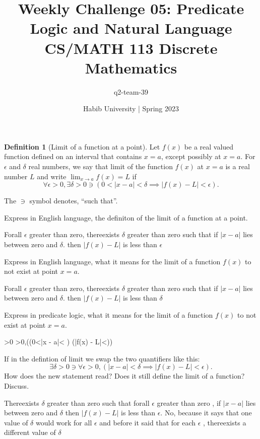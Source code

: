 \documentclass[a4paper]{exam}
\title{Weekly Challenge 05: Predicate Logic and Natural Language\\CS/MATH 113 Discrete Mathematics}
\author{q2-team-39}  %
\date{Habib University | Spring 2023}
\theoremstyle{definition}
\newtheorem{definition}{Definition}
\begin{document}
\maketitle

\begin{questions}

  \begin{definition}[Limit of a function at a point]
    Let $f(x)$ be a real valued function defined on an interval that contains $x=a$, except possibly at $x=a$. For $\epsilon$ and $\delta$ real numbers, we say that limit of the function $f(x)$ at $x=a$ is a real number $L$ and write $\lim_{x \to a} f(x)=L$ if 
    \[
      \forall \epsilon>0, \exists \delta>0 \ni (0<|x-a|<\delta \implies |f(x)-L|<\epsilon).
    \]
  \end{definition}
  The $\ni$ symbol denotes, ``such that''.
  \begin{parts}
  \item Express in English language, the definiton of the limit of a function at a point.
    \begin{solution}
      Forall $\epsilon$ greater than zero, thereexists $\delta$ greater than zero such that if $|x − a|$ lies between zero and $\delta$. then $|f(x) − L|$ is less than $\epsilon$
    \end{solution}
  \item Express in English language, what it means for the limit of a function $f(x)$ to not exist at point $x=a$.
    \begin{solution}
      Forall 
      $\epsilon$ greater than zero, thereexists $\delta$ greater than zero such that if $|x − a|$ lies between zero and $\delta$. then $|f(x) − L|$ is less than $\delta$
    \end{solution}
  \item Express in predicate logic, what it means for the limit of a function $f(x)$ to not exist at point $x=a$.
    \begin{solution}
      \exists \epsilon>0 \ni \forall \delta>0,((0<|x - a|< \delta) \land \neg(|f(x) - L|<\epsilon))
    \end{solution}
  \item If in the defintion of limit we swap the two quantifiers like this:
    \[
      \exists \delta>0 \ni \forall \epsilon>0, (|x-a|<\delta \implies |f(x)-L|<\epsilon).
    \]
    How does the new statement read? Does it still define the limit of a function? Discuss.
    \begin{solution}
      Thereexists $\delta$ greater than zero such that forall $\epsilon$ greater than zero , if $|x - a|$ lies between zero and $\delta$ then $|f(x)-L|$ is less than $\epsilon$. No, because it says that one value of $\delta$ would work for all $\epsilon$ and before it said that for each $\epsilon$ , thereexists a different value of $\delta$
    \end{solution}
  \end{parts}
\end{questions}
\end{document}
